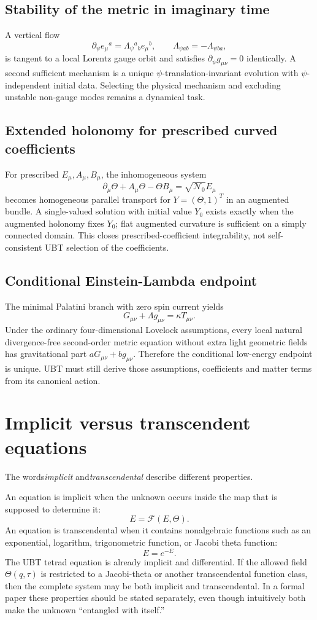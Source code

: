 \subsection{Stability of the metric in imaginary time}
A vertical flow
\[
 \partial_\psi e_\mu{}^a=\Lambda_\psi{}^a{}_b e_\mu{}^b,
 \qquad \Lambda_{\psi ab}=-\Lambda_{\psi ba},
\]
is tangent to a local Lorentz gauge orbit and satisfies
$\partial_\psi g_{\mu\nu}=0$ identically. A second sufficient mechanism is a
unique $\psi$-translation-invariant evolution with $\psi$-independent initial
data. Selecting the physical mechanism and excluding unstable non-gauge modes
remains a dynamical task.

\subsection{Extended holonomy for prescribed curved coefficients}
For prescribed $E_\mu,A_\mu,B_\mu$, the inhomogeneous system
\[
 \partial_\mu\Theta+A_\mu\Theta-\Theta B_\mu
 =\sqrt{\mathcal N_0}E_\mu
\]
becomes homogeneous parallel transport for $Y=(\Theta,1)^T$ in an augmented
bundle. A single-valued solution with initial value $Y_0$ exists exactly when
the augmented holonomy fixes $Y_0$; flat augmented curvature is sufficient on
a simply connected domain. This closes prescribed-coefficient integrability,
not self-consistent UBT selection of the coefficients.

\subsection{Conditional Einstein-Lambda endpoint}
The minimal Palatini branch with zero spin current yields
\[
 G_{\mu\nu}+\Lambda g_{\mu\nu}=\kappa T_{\mu\nu}.
\]
Under the ordinary four-dimensional Lovelock assumptions, every local natural
divergence-free second-order metric equation without extra light geometric
fields has gravitational part $aG_{\mu\nu}+bg_{\mu\nu}$. Therefore the
conditional low-energy endpoint is unique. UBT must still derive those
assumptions, coefficients and matter terms from its canonical action.

\section{Implicit versus transcendent equations}
The words\emph{implicit} and\emph{transcendental} describe different
properties.

An equation is implicit when the unknown occurs inside the map that is supposed
to determine it:
\[
 E=\mathcal F(E,\Theta).
\]
An equation is transcendental when it contains nonalgebraic functions such as
an exponential, logarithm, trigonometric function, or Jacobi theta function:
\[
 E=e^{-E}.
\]
The UBT tetrad equation is already implicit and differential.  If the allowed
field $\Theta(q,\tau)$ is restricted to a Jacobi-theta or another transcendental
function class, then the complete system may be both implicit and
transcendental.  In a formal paper these properties should be stated
separately, even though intuitively both make the unknown ``entangled with
itself.''

